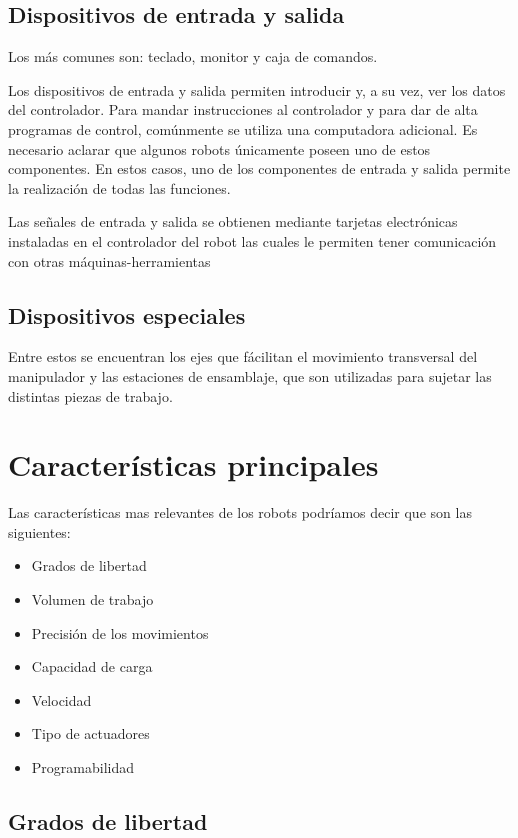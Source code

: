 \documentclass[12pt,a4paper]{report}
\begin{document}
\subsection{Dispositivos de entrada y salida}
Los más comunes son: teclado, monitor y caja de comandos.

Los dispositivos de entrada y salida permiten introducir y, a su vez, ver los
datos del controlador. Para mandar instrucciones al controlador y para dar de
alta programas de control, comúnmente se utiliza una computadora adicional. Es
necesario aclarar que algunos robots únicamente poseen uno de estos componentes.
En estos casos, uno de los componentes de entrada y salida permite la
realización de todas las funciones.

Las señales de entrada y salida se obtienen mediante tarjetas electrónicas
instaladas en el controlador del robot las cuales le permiten tener comunicación
con otras máquinas-herramientas


\subsection{Dispositivos especiales}
Entre estos se encuentran los ejes que fácilitan el movimiento transversal del
manipulador y las estaciones de ensamblaje, que son utilizadas para sujetar las
distintas piezas de trabajo.



\section{Características principales}

Las características mas relevantes de los robots podríamos decir que son las
siguientes:

\begin{itemize}
    \item Grados de libertad
    \item Volumen de trabajo
    \item Precisión de los movimientos
    \item Capacidad de carga
    \item Velocidad
    \item Tipo de actuadores
    \item Programabilidad
\end{itemize}
 

    
\subsection{Grados de libertad}
\end{document}
